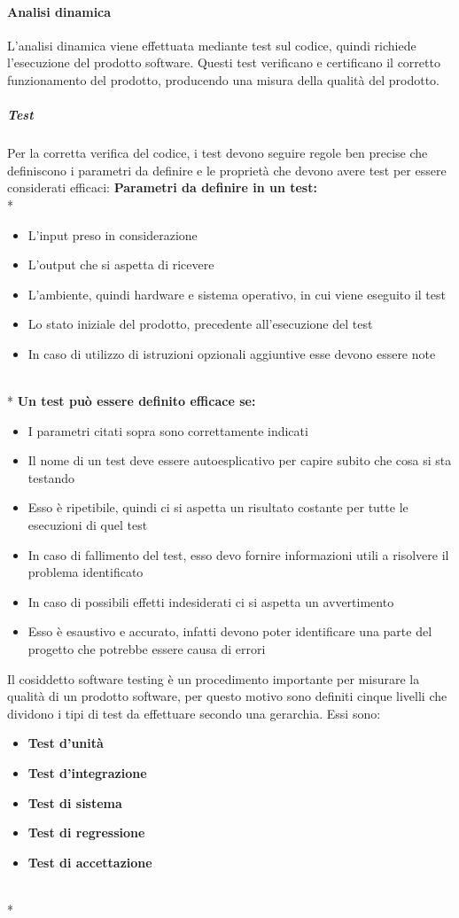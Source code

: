 		\paragraph{Analisi dinamica}
			L'analisi dinamica viene effettuata mediante test sul codice, quindi richiede l'esecuzione del prodotto software. Questi test verificano e certificano il corretto funzionamento del prodotto, producendo una misura della qualità del prodotto. 
			\subparagraph{Test}
				Per la corretta verifica del codice, i test devono seguire regole ben precise che definiscono i parametri da definire e le proprietà che devono avere test per essere considerati efficaci:
				\textbf{Parametri da definire in un test:} \\*
				\begin{itemize}
					\item L'input preso in considerazione
					\item L'output che si aspetta di ricevere
					\item L'ambiente, quindi hardware e sistema operativo, in cui viene eseguito il test
					\item Lo stato iniziale del prodotto, precedente all'esecuzione del test
					\item In caso di utilizzo di istruzioni opzionali aggiuntive esse devono essere note
				\end{itemize} \\*
				\textbf{Un test può essere definito efficace se:}
				\begin{itemize}
					\item I parametri citati sopra sono correttamente indicati
					\item Il nome di un test deve essere autoesplicativo per capire subito che cosa si sta testando
					\item Esso è ripetibile, quindi ci si aspetta un risultato costante per tutte le esecuzioni di quel test
					\item In caso di fallimento del test, esso devo fornire informazioni utili a risolvere il problema identificato
					\item In caso di possibili effetti indesiderati ci si aspetta un avvertimento
					\item Esso è esaustivo e accurato, infatti devono poter identificare una parte del progetto che potrebbe essere causa di errori
				\end{itemize}
				Il cosiddetto software testing è un procedimento importante per misurare la qualità di un prodotto software, per questo motivo sono definiti cinque livelli che dividono i tipi di test da effettuare secondo una gerarchia. Essi sono: 
				\begin{itemize}
					\item \textbf{Test d'unità}
					\item \textbf{Test d'integrazione}
					\item \textbf{Test di sistema}
					\item \textbf{Test di regressione}
					\item \textbf{Test di accettazione}
				\end{itemize} \\*
				
